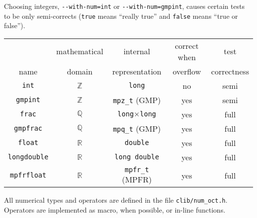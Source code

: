 \documentclass[twosides]{report}
\begin{document}
Choosing integers, {\tt -{}-with-num=int} or {\tt -{}-with-num=gmpint}, 
causes certain tests to
be only semi-corrects ({\tt true} means ``really true'' and {\tt false}
means ``true or false'').

\medskip

\begin{tabular}{c|c|c|c|c}
&mathematical&internal&correct when&test\\
name&domain&representation&overflow&correctness\\
\hline
{\tt int}&$\mathbb{Z}$&{\tt long}&no&semi\\
{\tt gmpint}&$\mathbb{Z}$&{\tt mpz\_t} (GMP)&yes&semi\\
{\tt frac}&$\mathbb{Q}$&{\tt long$\times$long}&yes&full\\
{\tt gmpfrac}&$\mathbb{Q}$&{\tt mpq\_t} (GMP)&yes&full\\
{\tt float}&$\mathbb{R}$&{\tt double}&yes&full\\
{\tt longdouble}&$\mathbb{R}$&{\tt long double}&yes&full\\
{\tt mpfrfloat}&$\mathbb{R}$&{\tt mpfr\_t} (MPFR)&yes&full\\
\end{tabular}

\medskip

All numerical types and operators are defined in the file
{\tt clib/num\_oct.h}.
Operators are implemented as macro, when possible, or in-line functions.

\medskip
\end{document}
